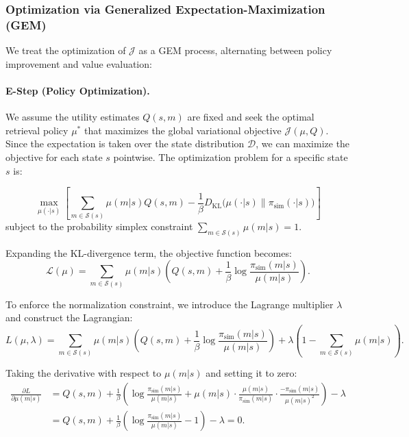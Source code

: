 \documentclass{article}
\theoremstyle{plain}
\theoremstyle{definition}
\theoremstyle{remark}
\begin{document}
\subsubsection{Optimization via Generalized Expectation-Maximization (GEM)}
We treat the optimization of $\mathcal{J}$ as a GEM process, alternating between policy improvement and value evaluation:

\paragraph{E-Step (Policy Optimization).} 
We assume the utility estimates $Q(s, m)$ are fixed and seek the optimal retrieval policy $\mu^*$ that maximizes the global variational objective $\mathcal{J}(\mu, Q)$. Since the expectation is taken over the state distribution $\mathcal{D}$, we can maximize the objective for each state $s$ pointwise. The optimization problem for a specific state $s$ is:

\begin{equation}
\max_{\mu(\cdot|s)} \left[ \sum_{m \in \mathcal{S}(s)} \mu(m|s) Q(s, m) - \frac{1}{\beta} D_{\text{KL}}\Big(\mu(\cdot|s) \big\| \pi_{\text{sim}}(\cdot|s)\Big) \right]
\end{equation}
subject to the probability simplex constraint $\sum_{m \in \mathcal{S}(s)} \mu(m|s) = 1$.

Expanding the KL-divergence term, the objective function becomes:
\begin{equation}
\mathcal{L}(\mu) = \sum_{m \in \mathcal{S}(s)} \mu(m|s) \left( Q(s, m) + \frac{1}{\beta} \log \frac{\pi_{\text{sim}}(m|s)}{\mu(m|s)} \right).
\end{equation}

To enforce the normalization constraint, we introduce the Lagrange multiplier $\lambda$ and construct the Lagrangian:
\begin{equation*}
L(\mu, \lambda) = \sum_{m \in \mathcal{S}(s)} \mu(m|s) \left( Q(s, m) + \frac{1}{\beta} \log \frac{\pi_{\text{sim}}(m|s)}{\mu(m|s)} \right) + \lambda \left( 1 - \sum_{m \in \mathcal{S}(s)} \mu(m|s) \right).
\end{equation*}

Taking the derivative with respect to $\mu(m|s)$ and setting it to zero:
\begin{equation*}
\begin{aligned}
\frac{\partial L}{\partial \mu(m|s)} &= Q(s, m) + \frac{1}{\beta} \left( \log \frac{\pi_{\text{sim}}(m|s)}{\mu(m|s)} + \mu(m|s) \cdot \frac{\mu(m|s)}{\pi_{\text{sim}}(m|s)} \cdot \frac{-\pi_{\text{sim}}(m|s)}{\mu(m|s)^2} \right) - \lambda \\
&= Q(s, m) + \frac{1}{\beta} \left( \log \frac{\pi_{\text{sim}}(m|s)}{\mu(m|s)} - 1 \right) - \lambda = 0.
\end{aligned}
\end{equation*}
\end{document}
